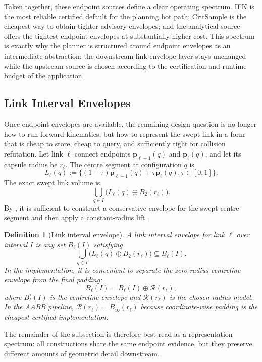 \documentclass[journal]{IEEEtran}
\newtheorem{definition}{Definition}
\begin{document}
Taken together, these endpoint sources define a clear operating spectrum. IFK
is the most reliable certified default for the planning hot path; CritSample is
the cheapest way to obtain tighter advisory envelopes; and the analytical
source offers the tightest endpoint envelopes at substantially higher cost.
This spectrum is exactly why the planner is
structured around endpoint envelopes as an intermediate abstraction: the
downstream link-envelope layer stays unchanged while the upstream source is
chosen according to the certification and runtime budget of the application.

\subsection{Link Interval Envelopes}\label{sec:rewrite_link_env}

Once endpoint envelopes are available, the remaining design question is no
longer how to run forward kinematics, but how to represent the swept link in a
form that is cheap to store, cheap to query, and sufficiently tight for
collision refutation. Let link $\ell$ connect endpoints
$\bm{p}_{\ell-1}(q)$ and $\bm{p}_{\ell}(q)$, and let its capsule radius be
$r_\ell$. The centre segment at configuration $q$ is
\[
L_\ell(q) := \{(1-\tau)\bm{p}_{\ell-1}(q) + \tau \bm{p}_{\ell}(q) :
\tau \in [0,1]\}.
\]
The exact swept link volume is
\[
\bigcup_{q\in I} \bigl(L_\ell(q) \oplus B_2(r_\ell)\bigr).
\]
By , it is sufficient to construct a conservative
envelope for the swept centre segment and then apply a constant-radius lift.

\begin{definition}[Link interval envelope]\label{def:link_interval_env}
A link interval envelope for link $\ell$ over interval $I$ is any set
$B_\ell(I)$ satisfying
\[
\bigcup_{q\in I} \bigl(L_\ell(q) \oplus B_2(r_\ell)\bigr) \subseteq B_\ell(I).
\]
In the implementation, it is convenient to separate the zero-radius centreline
envelope from the final padding:
\[
B_\ell(I) = B_\ell^{\circ}(I) \oplus \mathcal{R}(r_\ell),
\]
where $B_\ell^{\circ}(I)$ is the centreline envelope and
$\mathcal{R}(r_\ell)$ is the chosen radius model. In the AABB pipeline,
$\mathcal{R}(r_\ell)=B_\infty(r_\ell)$ because coordinate-wise padding is the
cheapest certified implementation.
\end{definition}

The remainder of the subsection is therefore best read as a representation
spectrum: all constructions share the same endpoint evidence, but they preserve
different amounts of geometric detail downstream.
\end{document}
